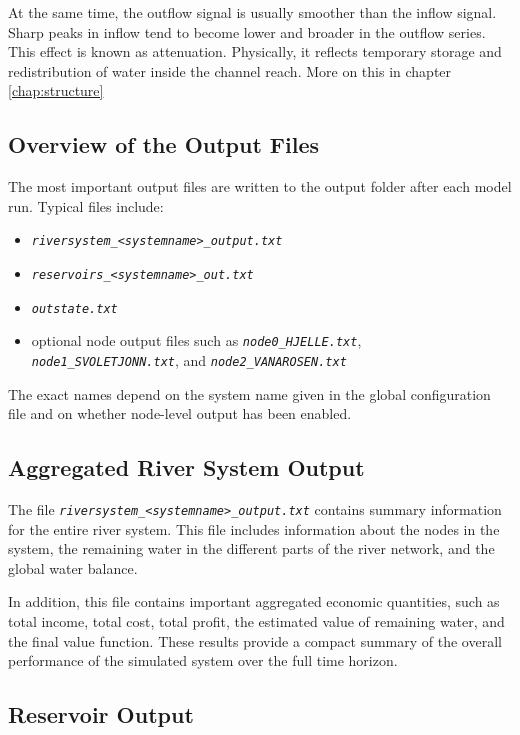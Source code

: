 \documentclass[a4paper, 12pt]{report}
\newcommand{\file}[1]{\textit{\texttt{#1}}}  %
\begin{document}
	At the same time, the outflow signal is usually smoother than the inflow signal. Sharp peaks in inflow tend to become lower and broader in the outflow series. This effect is known as attenuation. Physically, it reflects temporary storage and redistribution of water inside the channel reach. More on this in chapter \ref{chap:structure}


	\subsection{Overview of the Output Files}

	The most important output files are written to the output folder after each model run. Typical files include:

	\begin{itemize}
		\item \file{riversystem\_<systemname>\_output.txt}
		\item \file{reservoirs\_<systemname>\_out.txt}
		\item \file{outstate.txt}
		\item optional node output files such as \file{node0\_HJELLE.txt}, \file{node1\_SVOLETJONN.txt}, and \file{node2\_VANAROSEN.txt}
	\end{itemize}

	The exact names depend on the system name given in the global configuration file and on whether node-level output has been enabled.

	\subsection{Aggregated River System Output}

	The file \file{riversystem\_<systemname>\_output.txt} contains summary information for the entire river system. This file includes information about the nodes in the system, the remaining water in the different parts of the river network, and the global water balance.

	In addition, this file contains important aggregated economic quantities, such as total income, total cost, total profit, the estimated value of remaining water, and the final value function. These results provide a compact summary of the overall performance of the simulated system over the full time horizon.

	\subsection{Reservoir Output}
\end{document}
